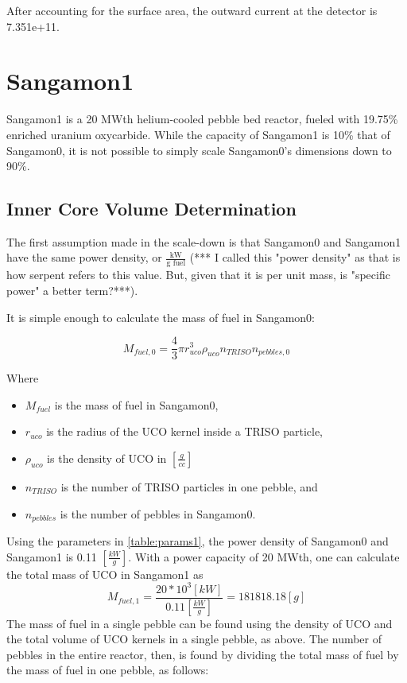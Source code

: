 After accounting for the surface area, the outward current at the detector is 7.351e+11.

\section{Sangamon1}

Sangamon1 is a 20 MWth helium-cooled pebble bed reactor, fueled with 19.75\% enriched uranium oxycarbide.  While the capacity of Sangamon1 is 10\% that of Sangamon0, it is not possible to simply scale Sangamon0's dimensions down to 90\%.

\subsection{Inner Core Volume Determination}

The first assumption made in the scale-down is that Sangamon0 and Sangamon1 have the same power density, or $\frac{\text{kW}}{\text{g fuel}}$ (*** I called this "power density" as that is how serpent refers to this value.  But, given that it is per unit mass, is "specific power" a better term?***).

It is simple enough to calculate the mass of fuel in Sangamon0:

\begin{equation}
M_{fuel,0} = \frac{4}{3}\pi r_{uco}^3 \rho_{uco} n_{TRISO} n_{pebbles,0}
\end{equation}

Where
\begin{itemize}
\item $M_{fuel}$ is the mass of fuel in Sangamon0,
\item $r_{uco}$ is the radius of the UCO kernel inside a TRISO particle,
\item $\rho_{uco}$ is the density of UCO in $[\frac{g}{cc}]$
\item $n_{TRISO}$ is the number of TRISO particles in one pebble, and
\item $n_{pebbles}$ is the number of pebbles in Sangamon0.
\end{itemize}

Using the parameters in \ref{table:params1}, the power density of Sangamon0 and Sangamon1 is 0.11 $[\frac{kW}{g}]$.  With a power capacity of 20 MWth, one can calculate the total mass of UCO in Sangamon1 as
\begin{equation}
M_{fuel,1} = \frac{20*10^3 [kW]}{0.11[\frac{kW}{g}]} = 181818.18 [g]
\end{equation}
The mass of fuel in a single pebble can be found using the density of UCO and the total volume of UCO kernels in a single pebble, as above.  The number of pebbles in the entire reactor, then, is found by dividing the total mass of fuel by the mass of fuel in one pebble, as follows:

